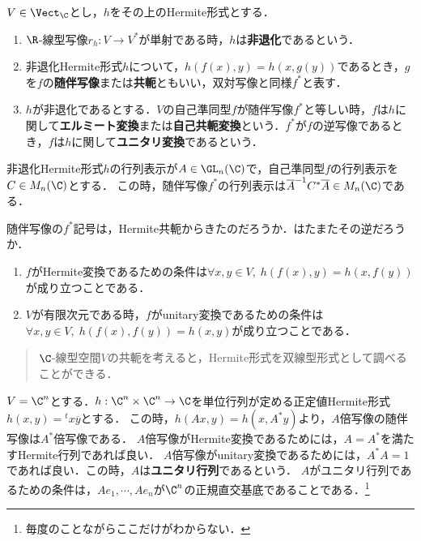 \documentclass[uplatex, dvipdfmx]{jsreport}
\begin{document}
\begin{definition}
    $V\in\Vect_\C$とし，$h$をその上のHermite形式とする．
    \begin{enumerate}
        \item $\R$-線型写像$r_h:V\to V^*$が単射である時，$h$は\textbf{非退化}であるという．
        \item 非退化Hermite形式$h$について，$h(f(x),y)=h(x,g(y))$であるとき，$g$を$f$の\textbf{随伴写像}または\textbf{共軛}ともいい，双対写像と同様$f^*$と表す．
        \item $h$が非退化であるとする．$V$の自己準同型$f$が随伴写像$f^*$と等しい時，$f$は$h$に関して\textbf{エルミート変換}または\textbf{自己共軛変換}という．$f^*$が$f$の逆写像であるとき，$f$は$h$に関して\textbf{ユニタリ変換}であるという．
    \end{enumerate}
\end{definition}
\begin{remark}[随伴写像の行列表示]
    非退化Hermite形式$h$の行列表示が$A\in\GL_n(\C)$で，自己準同型$f$の行列表示を$C\in M_n(\C)$とする．
    この時，随伴写像$f^*$の行列表示は$\overline{A}^{-1}C^*\overline{A}\in M_n(\C)$である．

    随伴写像の$f^*$記号は，Hermite共軛からきたのだろうか．はたまたその逆だろうか．
\end{remark}
\begin{remark}\mbox{}
    \begin{enumerate}
        \item $f$がHermite変換であるための条件は$\forall x,y\in V,\; h(f(x),y)=h(x,f(y))$が成り立つことである．
        \item $V$が有限次元である時，$f$がunitary変換であるための条件は$\forall x,y\in V,\;h(f(x),f(y))=h(x,y)$が成り立つことである．
    \end{enumerate}
\end{remark}
\begin{remark}
    \begin{quote}
        $\C$-線型空間$V$の共軛を考えると，Hermite形式を双線型形式として調べることができる．
    \end{quote}
\end{remark}

\begin{example}[標準内積]
    $V=\C^n$とする．$h:\C^n\times\C^n\to\C$を単位行列が定める正定値Hermite形式$h(x,y)={}^t\!x\overline{y}$とする．
    この時，$h(Ax,y)=h(x,A^*y)$より，$A$倍写像の随伴写像は$A^*$倍写像である．
    $A$倍写像がHermite変換であるためには，$A=A^*$を満たすHermite行列であれば良い．
    $A$倍写像がunitary変換であるためには，$A^*A=1$であれば良い．この時，$A$は\textbf{ユニタリ行列}であるという．
    $A$がユニタリ行列であるための条件は，$Ae_1,\cdots,Ae_n$が$\C^n$の正規直交基底であることである．\footnote{毎度のことながらここだけがわからない．}
\end{example}
\end{document}
